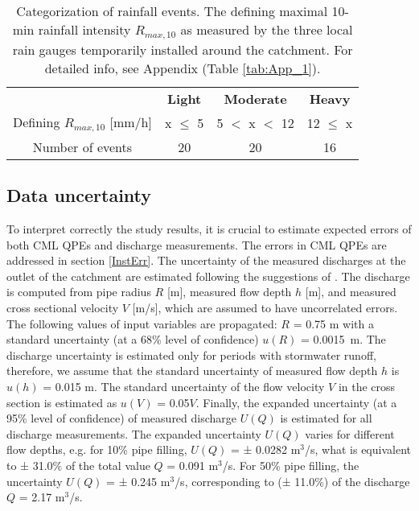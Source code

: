 \documentclass{ctuthesis}\usepackage[]{graphicx}\usepackage[]{color}
\begin{document}
\begin{table}[h]
\begin{ctucolortab}
\centering
\begin{tabular}{ c | c  c  c  }
	    &       \textbf{Light}   &  \bfseries Moderate  &  \bfseries  Heavy    \\ \Midrule
        Defining $R_{max,10}$ [mm/h]  &  x $\leq$ 5  & 5 $<$ x $<$ 12 &  12 $\leq$ x     \\
            Number of events  &  20  & 20 &  16
\end{tabular}
\caption{Categorization of rainfall events. The defining maximal 10-min rainfall intensity $R_{max,10}$ as measured by the three local rain gauges temporarily installed around the catchment. For detailed info, see Appendix (Table \ref{tab:App_1}).}
\label{2tab2}
\end{ctucolortab}
\end{table}



\subsection{Data uncertainty} \label{Quncer}

To interpret correctly the study results, it is crucial to estimate expected errors of both CML QPEs and discharge measurements. The errors in CML QPEs are addressed in section \ref{InstErr}. The uncertainty of the measured discharges at the outlet of the catchment are estimated following the suggestions of \cite{musteStandardizedUncertaintyAnalysis2012}. The discharge is computed from pipe radius $R$ [m], measured flow depth $h$ [m], and measured cross sectional velocity $V$ [m/s], which are assumed to have uncorrelated errors. The following values of input variables are propagated: $R$ = 0.75 m with a standard uncertainty (at a 68\% level of confidence) $u(R)$ = 0.0015~m. The discharge uncertainty is estimated only for periods with stormwater runoff, therefore, we assume that the standard uncertainty of measured flow depth $h$ is $u(h)$ = 0.015 m. The standard uncertainty of the flow velocity $V$ in the cross section is estimated as $u(V)$ = 0.05$V$. Finally, the expanded uncertainty (at a 95\% level of confidence) of measured discharge $U(Q)$ is estimated for all discharge measurements. The expanded uncertainty $U(Q)$ varies for different flow depths, e.g. for 10\% pipe filling, $U(Q)$ = ± 0.0282 m$^3$/s, what is equivalent to ± 31.0\% of the total value $Q$ = 0.091 m$^3$/s. For 50\% pipe filling, the uncertainty $U(Q)$ = ± 0.245 m$^3$/s, corresponding to (± 11.0\%) of the discharge $Q$ = 2.17 m$^3$/s.
\end{document}
